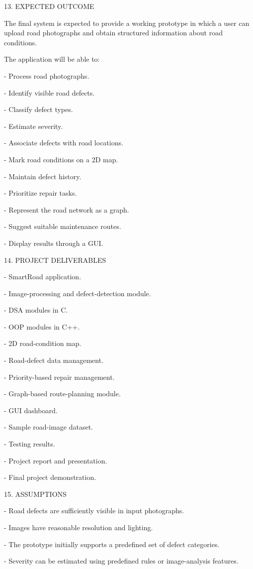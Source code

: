 \documentclass[
]{article}
\begin{document}
13. EXPECTED OUTCOME

The final system is expected to provide a working prototype in which a
user can upload road photographs and obtain structured information about
road conditions.

The application will be able to:

- Process road photographs.

- Identify visible road defects.

- Classify defect types.

- Estimate severity.

- Associate defects with road locations.

- Mark road conditions on a 2D map.

- Maintain defect history.

- Prioritize repair tasks.

- Represent the road network as a graph.

- Suggest suitable maintenance routes.

- Display results through a GUI.

14. PROJECT DELIVERABLES

- SmartRoad application.

- Image-processing and defect-detection module.

- DSA modules in C.

- OOP modules in C++.

- 2D road-condition map.

- Road-defect data management.

- Priority-based repair management.

- Graph-based route-planning module.

- GUI dashboard.

- Sample road-image dataset.

- Testing results.

- Project report and presentation.

- Final project demonstration.

15. ASSUMPTIONS

- Road defects are sufficiently visible in input photographs.

- Images have reasonable resolution and lighting.

- The prototype initially supports a predefined set of defect
categories.

- Severity can be estimated using predefined rules or image-analysis
features.
\end{document}

